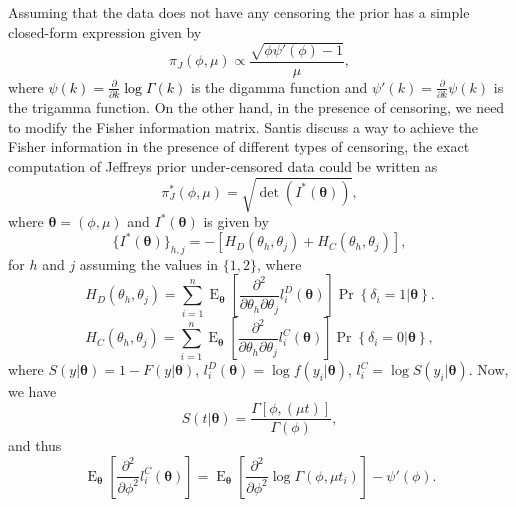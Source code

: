\documentclass[]{interact}
\newcommand{\f}{\operatorname}
\theoremstyle{plain}%
\theoremstyle{definition}
\theoremstyle{remark}
\begin{document}
Assuming that the data does not have any censoring the prior has a simple closed-form expression given by
\begin{equation*}%
\pi_J\left(\phi,\mu\right)\propto \frac{\sqrt{\phi\psi'(\phi)-1}}{\mu},
\end{equation*}
where \textcolor{black}{$\psi(k)=\frac{\partial}{\partial k}\log\Gamma(k)$} is the digamma function and $\psi'(k)=\frac{\partial}{\partial k}\psi(k)$ is the trigamma function.
On the other hand, in the presence of censoring, we need to modify the Fisher information matrix. Santis \cite{de2001jeffreys} discuss a way to achieve the Fisher information in the presence of different types of censoring, the exact computation of Jeffreys prior under-censored data could be written as
\begin{equation*}
\pi_J^*\left(\phi,\mu\right)=\sqrt{\det(I^*(\boldsymbol{\theta}))},
\end{equation*}
where $\boldsymbol{\theta}=(\phi,\mu)$ and $I^*(\boldsymbol{\theta})$ is given by
\begin{equation*} \{I^*(\boldsymbol{\theta})\}_{h,j} = -[H_D(\theta_h,\theta_j)+H_C(\theta_h,\theta_j)],
\end{equation*}
for $h$ and $j$ assuming the values in $\{1,2\}$, where
\begin{equation*} 
H_D(\theta_h,\theta_j) = \sum_{i=1}^n \f{E}_{\boldsymbol{\theta}}\left[\frac{\partial^2}{\partial \theta_h\partial \theta_j} l_i^D(\boldsymbol{\theta})\right]\f{Pr}\left\{\delta_i=1|\boldsymbol{\theta}\right\}.
\end{equation*}
\begin{equation*}
H_C(\theta_h,\theta_j) = \sum_{i=1}^n \f{E}_{\boldsymbol{\theta}}\left[\frac{\partial^2}{\partial \theta_h\partial \theta_j} l^C_i(\boldsymbol{\theta})\right]\f{Pr}\left\{\delta_i=0|\boldsymbol{\theta}\right\},
\end{equation*}
where $S(y|\boldsymbol{\theta}) = 1-F(y|\boldsymbol{\theta})$, $l_i^D(\boldsymbol{\theta})=\log f(y_i|\boldsymbol{\theta})$, $l_i^C=\log S(y_i|\boldsymbol{\theta})$. Now, we have
\begin{equation*} 
S(t|\boldsymbol{\theta}) = \frac{\Gamma[\phi,(\mu t)]}{\Gamma(\phi)},
\end{equation*}
and thus
\begin{equation*} \f{E}_{\boldsymbol{\theta}}\left[ \frac{\partial^2}{\partial \phi ^2} l_i^C(\boldsymbol{\theta})\right] = \f{E}_{\boldsymbol{\theta}}\left[ \frac{\partial^2}{\partial \phi ^2} \log \Gamma(\phi,\mu t_i)\right]-\psi'(\phi).
\end{equation*}
\end{document}
